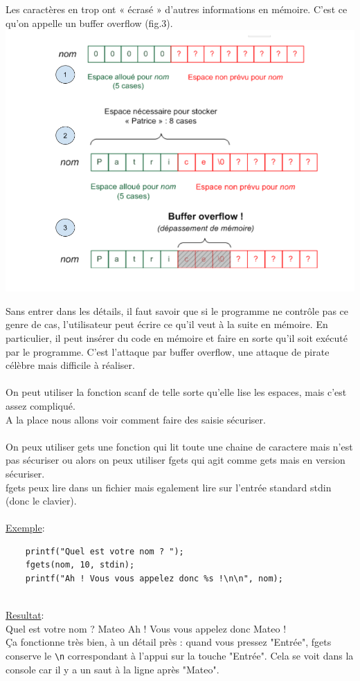 \documentclass[a4paper,12pt,openany]{book}
\begin{document}
{Les caractères en trop ont « écrasé » d'autres informations en mémoire. C'est ce qu'on appelle un buffer overflow (fig.3).\\
\includegraphics[width=1\linewidth,center]{img/scanf_buffer_overflow.png}

Sans entrer dans les détails, il faut savoir que si le programme ne contrôle pas ce genre de cas, l'utilisateur peut écrire ce qu'il veut à la suite en mémoire. En particulier, il peut insérer du code en mémoire et faire en sorte qu'il soit exécuté par le programme. C'est l'attaque par buffer overflow, une attaque de pirate célèbre mais difficile à réaliser.\\
\\
On peut utiliser la fonction scanf de telle sorte qu'elle lise les espaces, mais c'est assez compliqué.\\
A la place nous allons voir comment faire des saisie sécuriser.\\
\\
On peux utiliser gets une fonction qui lit toute une chaine de caractere mais n'est pas sécuriser ou alors on peux utiliser fgets qui agit comme gets mais en version sécuriser.\\
fgets peux lire dans un fichier mais egalement lire sur l'entrée standard stdin (donc le clavier).\\
\\
\underline{Exemple}:\\
\begin{verbatim}
    printf("Quel est votre nom ? ");
    fgets(nom, 10, stdin);
    printf("Ah ! Vous vous appelez donc %s !\n\n", nom);
\end{verbatim}
\\
\underline{Resultat}:\\
Quel est votre nom ? Mateo
Ah ! Vous vous appelez donc Mateo
!
\\
Ça fonctionne très bien, à un détail près : quand vous pressez "Entrée", fgets conserve le \verb+\n+ correspondant à l'appui sur la touche "Entrée". Cela se voit dans la console car il y a un saut à la ligne après "Mateo".\\

}
\end{document}
